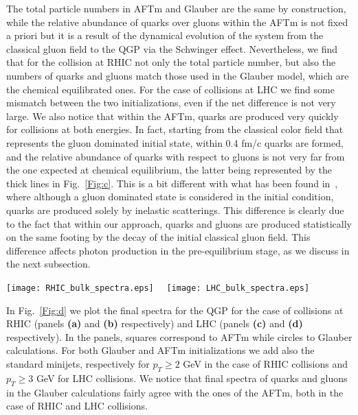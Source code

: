 \documentclass[aps,prc,a4paper,nofootinbib,
preprintnumbers,superscriptaddress,twocolumn,showpacs,showkeys]{revtex4}
\begin{document}
The total particle numbers in AFTm and Glauber are the same by construction, 
while the relative abundance of quarks over gluons within the AFTm is not fixed a priori but it is a result of the
dynamical evolution of the system from the classical gluon field to the QGP via the Schwinger effect.
Nevertheless, we find that for the collision at RHIC not only the total particle number, but also the numbers of
quarks and gluons match those used in the Glauber model,
which are the chemical equilibrated ones. 
For the case of collisions at LHC we find some mismatch between the two initializations, even if the net difference is not very large.
We also notice that within the AFTm, quarks are produced very quickly for collisions at both
energies. In fact, starting from the classical color field that represents the gluon dominated initial state,
within 0.4 fm/c quarks are formed, and the relative abundance of quarks with respect to gluons is not very far from the 
one expected at chemical equilibrium, the latter being represented by the thick lines in Fig.~\ref{Fig:c}. 
This is a bit different with what has been found in~\cite{Greif:2016jeb,Vovchenko:2016mtf,Ruggieri:2015tsa}, 
where although a gluon dominated state is considered in the initial condition, quarks are produced solely by
inelastic scatterings. This difference is clearly due to the fact that within our approach,
quarks and gluons are produced statistically on the same footing by the decay of the initial classical
gluon field. This difference affects photon production in the pre-equilibrium stage, as we discuss
in the next subsection.

\begin{figure*}[t!]
\begin{center}
\texttt{[image: RHIC\_bulk\_spectra.eps]}~~
\texttt{[image: LHC\_bulk\_spectra.eps]}
\caption{\label{Fig:d}Final spectra for gluons and quarks at RHIC (panels {\bf (a)} and {\bf (b)} respectively)
and at LHC (panels {\bf (c)} and {\bf (d)} respectively). In the panels,
squares correspond to AFTm while circles to Glauber calculations.}
\end{center}
\end{figure*}

In Fig.~\ref{Fig:d} we plot the final spectra for the QGP for the case of collisions at RHIC
(panels {\bf (a)} and {\bf (b)} respectively) and LHC (panels {\bf (c)} and {\bf (d)} respectively).
In the panels, squares correspond to AFTm while circles to Glauber calculations.
For both Glauber and AFTm initializations we add also the standard minijets, respectively
for $p_T \geq 2$ GeV in the case of RHIC collisions
and $p_T\geq 3$ GeV for LHC collisions.
We notice that 
final spectra of quarks and gluons in the Glauber calculations fairly agree with the ones
of the AFTm, both in the case of RHIC and LHC collisions.
\end{document}
